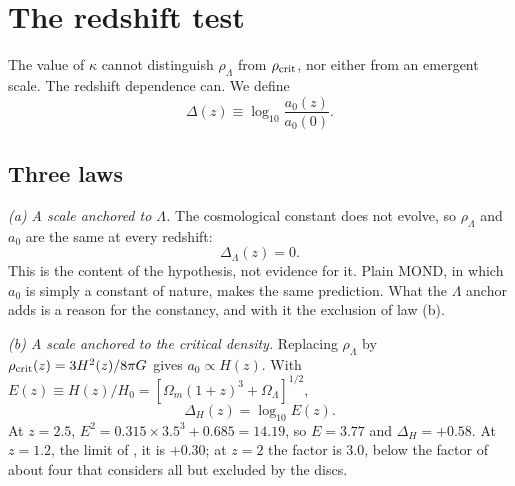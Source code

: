 \documentclass[fleqn,usenatbib]{mnras}
\begin{document}
\section{The redshift test}
\label{sec:ztest}
The value of $\kappa$ cannot distinguish $\rho_\Lambda$ from $\rho_{\rm crit}$, nor either from an emergent scale. The redshift dependence can. We define
\begin{equation}
\Delta(z)\equiv\log_{10}\frac{a_0(z)}{a_0(0)} .
\end{equation}

\subsection{Three laws}
\label{sec:laws}
\emph{(a) A scale anchored to $\Lambda$.} The cosmological constant does not evolve, so $\rho_\Lambda$ and $a_0$ are the same at every redshift:
\begin{equation}
\Delta_\Lambda(z)=0 .
\label{eq:lawflat}
\end{equation}
This is the content of the hypothesis, not evidence for it. Plain MOND, in which $a_0$ is simply a constant of nature, makes the same prediction. What the $\Lambda$ anchor adds is a reason for the constancy, and with it the exclusion of law (b).

\emph{(b) A scale anchored to the critical density.} Replacing $\rho_\Lambda$ by $\rho_{\rm crit}(z)=3H^2(z)/8\pi G$ gives $a_0\propto H(z)$. With $E(z)\equiv H(z)/H_0=[\Omega_m(1+z)^3+\Omega_\Lambda]^{1/2}$,
\begin{equation}
\Delta_H(z)=\log_{10}E(z) .
\label{eq:lawH}
\end{equation}
At $z=2.5$, $E^2=0.315\times3.5^3+0.685=14.19$, so $E=3.77$ and $\Delta_H=+0.58$. At $z=1.2$, the limit of \citet{Limbach2008}, it is $+0.30$; at $z=2$ the factor is 3.0, below the factor of about four that \citet{Milgrom2017} considers all but excluded by the \citet{Genzel2017} discs.
\end{document}
